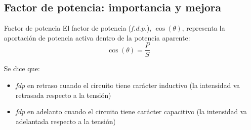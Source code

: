 \documentclass[aspectratio=169, usenames,svgnames,dvipsnames]{beamer}
\begin{document}

\subsection{Factor de potencia: importancia y mejora}

\begin{frame}{Factor de potencia}
    El factor de potencia (\textit{\alert{f.d.p.}}), \(\cos(\theta)\), representa la aportación de potencia activa dentro de la potencia aparente:
    \[
        \cos (\theta)=\dfrac{P}{S}
    \]

    Se dice que:
	\begin{itemize}
		\item \textit{fdp} \alert{en retraso} cuando el circuito tiene carácter inductivo (la intensidad va retrasada respecto a la tensión)

        \vspace{2mm}
		\item \textit{fdp} \alert{en adelanto} cuando el circuito tiene carácter capacitivo (la intensidad va adelantada respecto a la tensión)
	\end{itemize}	
\end{frame}

\end{document}
